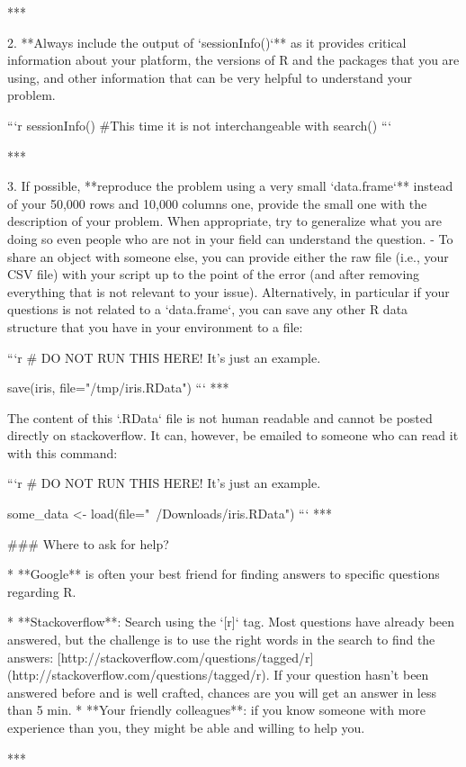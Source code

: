 {{***

2. **Always include the output of `sessionInfo()`** as it provides critical information about your platform, the versions of R and the packages that you are using, and other information that can be very helpful to understand your problem.

	```r
	sessionInfo()  #This time it is not interchangeable with search()
	```
	
***

3. If possible, **reproduce the problem using a very small `data.frame`**
instead of your 50,000 rows and 10,000 columns one, provide the small one with
the description of your problem. When appropriate, try to generalize what you
are doing so even people who are not in your field can understand the question. 
	- To share an object with someone else, you can provide either the raw file (i.e., your CSV file) with
your script up to the point of the error (and after removing everything that is
not relevant to your issue). Alternatively, in particular if your questions is
not related to a `data.frame`, you can save any other R data structure that you have in your environment to a file:

		```r
		# DO NOT RUN THIS HERE! It's just an example.

		save(iris, file="/tmp/iris.RData")
		```
***

		The content of this `.RData` file is not human readable and cannot be posted directly on stackoverflow. It can, however, be emailed to someone who can read it with this command:

		```r
		# DO NOT RUN THIS HERE! It's just an example.

		some_data <- load(file="~/Downloads/iris.RData")
		```
***

### Where to ask for help?

* **Google** is often your best friend for finding answers to specific questions regarding R. 
	
* **Stackoverflow**: Search using the `[r]` tag. Most questions have already been answered, but the challenge is to use the right words in the search to find the answers: [http://stackoverflow.com/questions/tagged/r](http://stackoverflow.com/questions/tagged/r). If your question hasn't been answered before and is well crafted, chances are you will get an answer in less than 5 min.
* **Your friendly colleagues**: if you know someone with more experience than you,
  they might be able and willing to help you.
  
***

}}
